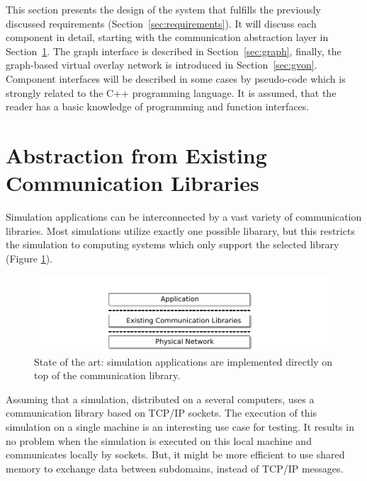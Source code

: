 This section presents the design of the system that fulfills the
previously discussed requirements (Section~\ref{sec:requirements}).
It will discuss each component in detail, starting with the
communication abstraction layer in
Section~\ref{sec:comm_abstraction}. The graph interface is
described in Section~\ref{sec:graph}, finally, the graph-based virtual
overlay network is introduced in Section~\ref{sec:gvon}. Component
interfaces will be described in some cases by pseudo-code which is
strongly related to the C++ programming language. It is assumed, that
the reader has a basic knowledge of programming and function
interfaces.

\section{Abstraction from Existing Communication Libraries}
\label{sec:comm_abstraction}

Simulation applications can be interconnected by a vast variety of
communication libraries. Most simulations utilize exactly one possible
libarary, but this restricts the simulation to computing systems which
only support the selected library (Figure
\ref{fig:design_state_of_the_art}).

\begin{figure}[H]
  \centering \includegraphics[width=\textwidth]{graphics/30_design_state_of_the_art}
  \caption{State of the art: simulation applications are implemented directly
  on top of the communication library.}
  \label{fig:design_state_of_the_art}
\end{figure}

Assuming that a simulation, distributed on a several computers, uses a
communication library based on TCP/IP sockets. The execution of this
simulation on a single machine is an interesting use case for
testing. It results in no problem when the simulation is executed on
this local machine and communicates locally by sockets.  But, it might
be more efficient to use shared memory to exchange data between
subdomains, instead of TCP/IP messages.

